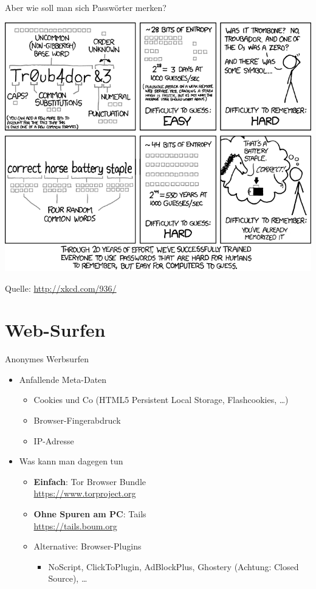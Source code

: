   \begin{frame}{Aber wie soll man sich Passwörter merken?}
    \begin{center}
      \includegraphics[width=0.9\textheight]{images/password_strength.png}\\
    \end{center}
    \tiny Quelle: \url{http://xkcd.com/936/}
  \end{frame}
\section{Web-Surfen}
  \begin{frame}{Anonymes Werbsurfen}
    \begin{itemize}
      \item Anfallende Meta-Daten
      \begin{itemize}
        \item Cookies und Co (HTML5 Persistent Local Storage, Flashcookies, \ldots)
        \item Browser-Fingerabdruck
        \item IP-Adresse
      \end{itemize}
      \item Was kann man dagegen tun
      \begin{itemize}
        \item \textbf{Einfach}: Tor Browser Bundle\\ \url{https://www.torproject.org}\\[.5cm]
        \item \textbf{Ohne Spuren am PC}: Tails\\ \url{https://tails.boum.org}\\[.5cm]
        \item Alternative: Browser-Plugins
          \begin{itemize}
            \item NoScript, ClickToPlugin, AdBlockPlus, Ghostery (Achtung: Closed Source), \ldots 
          \end{itemize}
      \end{itemize}
    \end{itemize}
  \end{frame}

